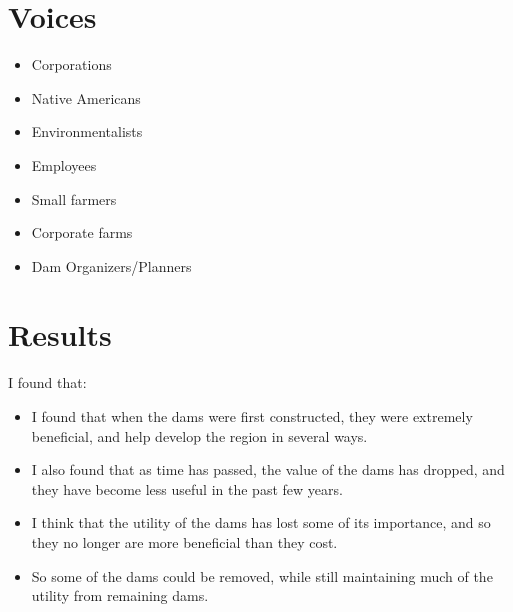 \documentclass[12pt]{article}
\begin{document}
\section{Voices}
\begin{itemize}
  \item Corporations
  \item Native Americans
  \item Environmentalists
  \item Employees
  \item Small farmers
  \item Corporate farms
  \item Dam Organizers/Planners
\end{itemize}
\section{Results}
I found that:
\begin{itemize}
  \item I found that when the dams were first constructed, they were extremely beneficial, and help develop the region in several ways.
  \item I also found that as time has passed, the value of the dams has dropped, and they have become less useful in the past few years.
  \item I think that the utility of the dams has lost some of its importance, and so they no longer are more beneficial than they cost.
  \item So some of the dams could be removed, while still maintaining much of the utility from remaining dams.
\end{itemize}
\end{document}
